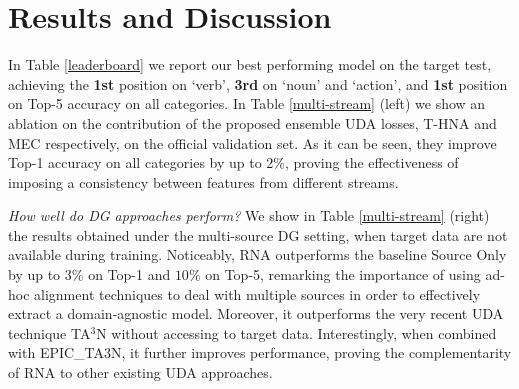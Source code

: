 \section{Results and Discussion}






In Table \ref{leaderboard} we report our best performing model on the target test, achieving the \textbf{1st} position on ‘verb', \textbf{3rd} on ‘noun' and ‘action', and \textbf{1st} position on Top-5 accuracy on all categories. In Table \ref{multi-stream} (left) we show an ablation on the contribution of the proposed ensemble UDA losses, T-HNA and MEC respectively, on the official validation set. As it can be seen, they improve Top-1 accuracy on all categories by up to $2\%$, proving the effectiveness of imposing a consistency between features from different streams. 

\textit{How well do DG approaches perform? } We show in Table \ref{multi-stream} (right) the results obtained under the multi-source DG setting, when target data are not available during training. Noticeably, RNA outperforms the baseline Source Only by up to $3\%$ on Top-1 and $10\%$ on Top-5, remarking the importance of using ad-hoc alignment techniques to deal with multiple sources in order to effectively extract a domain-agnostic model. Moreover, it outperforms the very recent UDA technique TA$^3$N without accessing to target data. 
Interestingly, when combined with EPIC\_TA3N, it further improves performance, proving the complementarity of RNA to other existing UDA approaches. 
